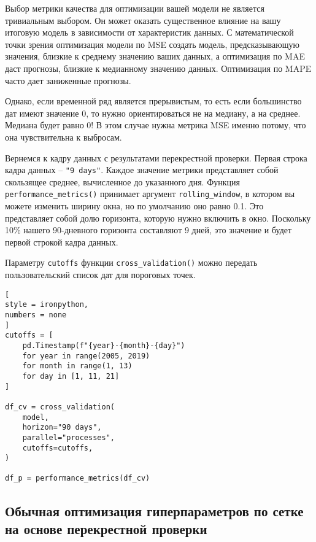 \documentclass[%
	11pt,
	a4paper,
	utf8,
		]{article}
\begin{document}
Выбор метрики качества для оптимизации вашей модели не является тривиальным выбором. Он может оказать существенное влияние на вашу итоговую модель в зависимости от характеристик данных. С математической точки зрения оптимизация модели по MSE создать модель, предсказывающую значения, близкие к среднему значению ваших данных, а оптимизация по MAE даст прогнозы, близкие к медианному значению данных. Оптимизация по MAPE часто дает заниженные прогнозы.

Однако, если временной ряд является прерывистым, то есть если большинство дат имеют значение 0, то нужно ориентироваться не на медиану, а на среднее. Медиана будет равно 0! В этом случае нужна метрика MSE именно потому, что она чувствительна к выбросам.

Вернемся к кадру данных с результатами перекрестной проверки. Первая строка кадра данных -- \verb|"9 days"|. Каждое значение метрики представляет собой скользящее среднее, вычисленное до указанного дня. Функция \verb|performance_metrics()| принимает аргумент \verb|rolling_window|, в котором вы можете изменить ширину окна, но по умолчанию оно равно 0.1. Это представляет собой долю горизонта, которую нужно включить в окно. Поскольку 10\% нашего 90-дневного горизонта составляют 9 дней, это значение и будет первой строкой кадра данных.

Параметру \verb|cutoffs| функции \verb|cross_validation()| можно передать пользовательский список дат для пороговых точек.
\begin{lstlisting}[
style = ironpython,
numbers = none
]
cutoffs = [
    pd.Timestamp(f"{year}-{month}-{day}")
    for year in range(2005, 2019)
    for month in range(1, 13)
    for day in [1, 11, 21]
]

df_cv = cross_validation(
    model,
    horizon="90 days",
    parallel="processes",
    cutoffs=cutoffs,
)

df_p = performance_metrics(df_cv)
\end{lstlisting}

\subsection{Обычная оптимизация гиперпараметров по сетке на основе перекрестной проверки}
\end{document}
